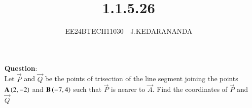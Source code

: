 \documentclass[journal]{IEEEtran}
\begin{document}

\vspace{3cm}

\title{1.1.5.26}
\author{EE24BTECH11030 - J.KEDARANANDA
}
{\let\newpage\relax\maketitle}

\renewcommand{\thefigure}{\theenumi}
\renewcommand{\thetable}{\theenumi}
\setlength{\intextsep}{10pt} %


\renewcommand{\thetable}{\theenumi}


\textbf{Question}:\\
Let $\vec{P}$ and $\vec{Q}$ be the points of trisection of the line segment joining the points $\mathbf{A}\left(2,-2\right)$ and $\mathbf{B}\left(-7,4\right)$ such that $\vec{P}$ is nearer to $\vec{A}$. Find the coordinates of  $\vec{P}$  and $\vec{Q}$\\
\end{document}

